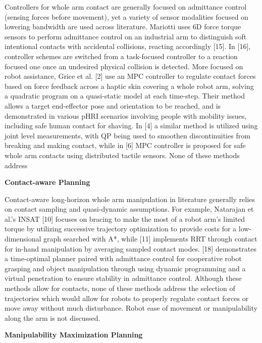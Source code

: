 \documentclass[conference]{IEEEtran}
\begin{document}
Controllers for whole arm contact are generally focused on admittance control (sensing forces before movement), yet a variety of sensor modalities focused on lowering bandwidth are used across literature. Mariotti uses 6D force torque sensors to perform admittance control on an industrial arm to distinguish soft intentional contacts with accidental collisions, reacting accordingly [15]. In [16], controller schemes are switched from a task-focused controller to a reaction focused one once an undesired physical collision is detected. More focused on robot assistance, Grice et al. [2] use an MPC controller to regulate contact forces based on force feedback across a haptic skin covering a whole robot arm, solving a quadratic program on a quasi-static model at each time-step. Their method allows a target end-effector pose and orientation to be reached, and is demonstrated in various pHRI scenarios involving people with mobility issues, including safe human contact for shaving. In [4] a similar method is utilized using joint level measurements, with QP being used to smoothen discontinuities from breaking and making contact, while in [6] MPC controller is proposed for safe whole arm contacts using distributed tactile sensors. None of these methods address 

\textbf{Contact-aware Planning}

Contact-aware long-horizon whole arm manipulation in literature generally relies on contact sampling and quasi-dynamic assumptions. For example, Natarajan et al.’s INSAT [10] focuses on bracing to make the most of a robot arm’s limited torque by utilizing successive trajectory optimization to provide costs for a low-dimensional graph searched with A*, while [11] implements RRT through contact for in-hand manipulation by averaging sampled contact modes. [18] demonstrates a time-optimal planner paired with admittance control for cooperative robot grasping and object manipulation through using dynamic programming and a virtual penetration to ensure stability in admittance control. Although these methods allow for contacts, none of these methods address the selection of trajectories which would allow for robots to properly regulate contact forces or move away without much disturbance. Robot ease of movement or manipulability along the arm is not discussed. 

\textbf{Manipulability Maximization Planning}
\end{document}

